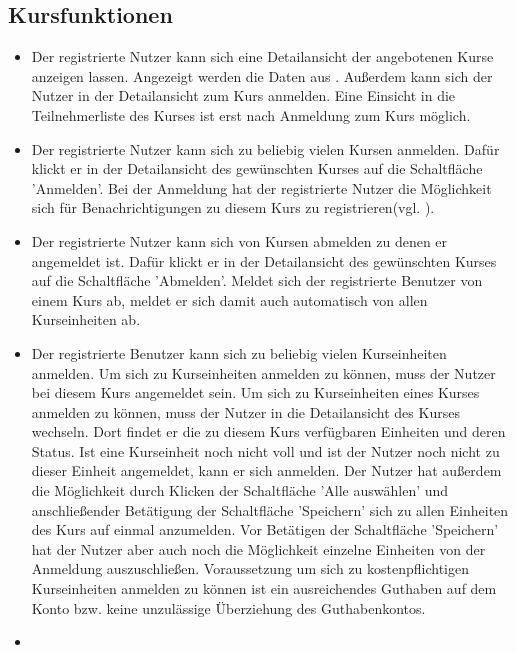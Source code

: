 \documentclass[a4paper]{scrreprt}
\begin{document}
		\subsection{Kursfunktionen}
			\begin{itemize}
				\item {}
					Der registrierte Nutzer kann sich eine Detailansicht der angebotenen Kurse anzeigen lassen. Angezeigt werden die Daten aus . Außerdem kann sich der Nutzer in der Detailansicht zum Kurs anmelden. Eine Einsicht in die Teilnehmerliste des Kurses ist erst nach Anmeldung zum Kurs möglich.
				\item {} 
					Der registrierte Nutzer kann sich zu beliebig vielen Kursen anmelden. 
					Dafür klickt er in der Detailansicht des gewünschten Kurses auf die Schaltfläche 'Anmelden'.
					Bei der Anmeldung hat der registrierte Nutzer die Möglichkeit sich für Benachrichtigungen zu diesem Kurs zu registrieren(vgl. ).
				\item {} 
					Der registrierte Nutzer kann sich von Kursen abmelden zu denen er angemeldet ist. Dafür klickt er in der Detailansicht des gewünschten Kurses auf die Schaltfläche 'Abmelden'. Meldet sich der registrierte Benutzer von einem Kurs ab, meldet er sich damit auch automatisch von allen Kurseinheiten ab.
				\item {}
					Der registrierte Benutzer kann sich zu beliebig vielen Kurseinheiten anmelden. Um sich zu Kurseinheiten anmelden zu können, muss der Nutzer bei diesem Kurs angemeldet sein.
					Um sich zu Kurseinheiten eines Kurses anmelden zu können, muss der Nutzer in die Detailansicht des Kurses wechseln. Dort findet er die zu diesem Kurs verfügbaren Einheiten und deren Status. Ist eine Kurseinheit noch nicht voll und ist der Nutzer noch nicht zu dieser Einheit angemeldet, kann er sich anmelden. Der Nutzer hat außerdem die Möglichkeit durch Klicken der Schaltfläche 'Alle auswählen' und anschließender Betätigung der Schaltfläche 'Speichern' sich zu allen Einheiten des Kurs auf einmal anzumelden. Vor Betätigen der Schaltfläche 'Speichern' hat der Nutzer aber auch noch die Möglichkeit einzelne Einheiten von der Anmeldung auszuschließen. Voraussetzung um sich zu kostenpflichtigen Kurseinheiten anmelden zu können ist ein ausreichendes Guthaben auf dem Konto bzw. keine unzulässige Überziehung des Guthabenkontos.
				\item {}

\end{itemize}
\end{document}
